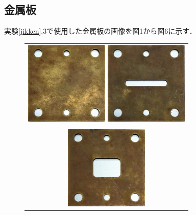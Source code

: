   \subsection{金属板}
  実験\ref{jikken}.3で使用した金属板の画像を図1から図6に示す．

  \begin{figure}[htpb]
    \centering

  \begin{tabular}{c}
    \begin{minipage}{0.50\hsize}
    \centering
    \includegraphics[keepaspectratio, width=4cm]{./data/1.png}
    \caption{}
    \end{minipage}

    \begin{minipage}{0.50\hsize}
    \centering
    \includegraphics[keepaspectratio, width=4cm]{./data/2.png}
    \caption{}
    \end{minipage}

    \\
    \\
    \begin{minipage}{0.50\hsize}
    \centering
    \includegraphics[keepaspectratio, width=4cm]{./data/3.png}
    \caption{}
    \end{minipage}


\end{tabular}
\end{figure}

